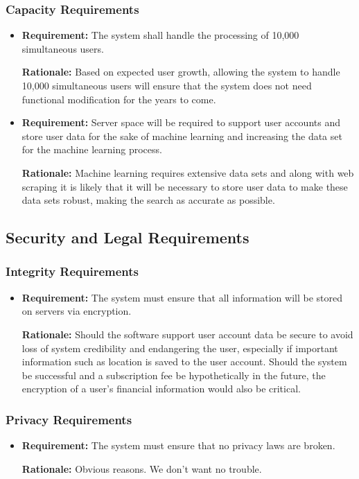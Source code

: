 \documentclass[12pt, titlepage]{article}
\begin{document}
\subsubsection{Capacity Requirements}
\begin{itemize}
    \item \textbf{Requirement:} The system shall handle the processing of 10,000 simultaneous users.
    
    \textbf{Rationale:} Based on expected user growth, allowing the system to handle 10,000 simultaneous users will ensure that the system does not need functional modification for the years to come.
    
    \item \textbf{Requirement:} Server space will be required to support user accounts and store user data for the sake of machine learning and increasing the data set for the machine learning process.
    
    \textbf{Rationale:} Machine learning requires extensive data sets and along with web scraping it is likely that it will be necessary to store user data to make these data sets robust, making the search as accurate as possible.
\end{itemize}

\subsection{Security and Legal Requirements}
\subsubsection{Integrity Requirements}
\begin{itemize}
\item 
    \textbf{Requirement:} The system must ensure that all information will be stored on servers via encryption.
    
    \textbf{Rationale:} Should the software support user account data be secure to avoid loss of system credibility and endangering the user, especially if important information such as location is saved to the user account. Should the system be successful and a subscription fee be hypothetically in the future, the encryption of a user's financial information would also be critical.
\end{itemize}

\subsubsection{Privacy Requirements}
\begin{itemize}
\item 
    \textbf{Requirement:} The system must ensure that no privacy laws are broken.
    
    \textbf{Rationale:} Obvious reasons. We don't want no trouble.
\end{itemize}
\end{document}
